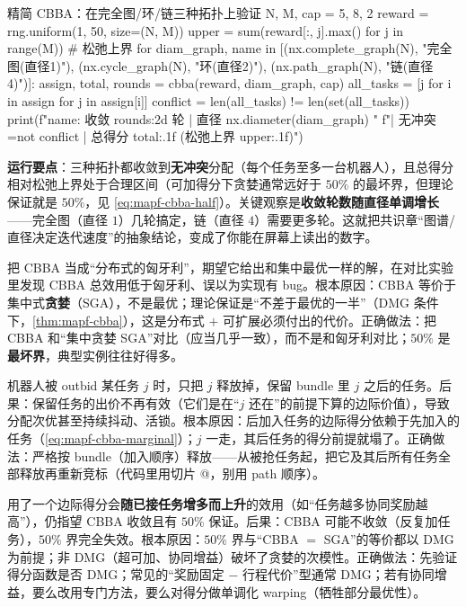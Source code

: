 \begin{codebox}[Python]{精简 CBBA：在完全图/环/链三种拓扑上验证}
N, M, cap = 5, 8, 2
reward = rng.uniform(1, 50, size=(N, M))
upper = sum(reward[:, j].max() for j in range(M))          # 松弛上界
for diam_graph, name in [(nx.complete_graph(N), "完全图(直径1)"),
                         (nx.cycle_graph(N), "环(直径2)"), (nx.path_graph(N), "链(直径4)")]:
    assign, total, rounds = cbba(reward, diam_graph, cap)
    all_tasks = [j for i in assign for j in assign[i]]
    conflict = len(all_tasks) != len(set(all_tasks))
    print(f"{name}: 收敛 {rounds:2d} 轮 | 直径 {nx.diameter(diam_graph)} "
          f"| 无冲突={not conflict} | 总得分 {total:.1f} (松弛上界 {upper:.1f})")
\end{codebox}

\textbf{运行要点}：三种拓扑都收敛到\textbf{无冲突}分配（每个任务至多一台机器人），且总得分相对松弛上界处于合理区间（可加得分下贪婪通常远好于 $50\%$ 的最坏界，但理论保证就是 $50\%$，见 \cref{eq:mapf-cbba-half}）。关键观察是\textbf{收敛轮数随直径单调增长}——完全图（直径 $1$）几轮搞定，链（直径 $4$）需要更多轮。这就把共识章“图谱/直径决定迭代速度”的抽象结论，变成了你能在屏幕上读出的数字。

\begin{pitfall}
把 CBBA 当成“分布式的匈牙利”，期望它给出和集中最优一样的解，在对比实验里发现 CBBA 总效用低于匈牙利、误以为实现有 bug。根本原因：CBBA 等价于集中式\textbf{贪婪}（SGA），不是最优；理论保证是“不差于最优的一半”（DMG 条件下，\cref{thm:mapf-cbba}），这是分布式 $+$ 可扩展必须付出的代价。正确做法：把 CBBA 和“集中贪婪 SGA”对比（应当几乎一致），而不是和匈牙利对比；$50\%$ 是\textbf{最坏界}，典型实例往往好得多。
\end{pitfall}

\begin{pitfall}
机器人被 outbid 某任务 $j$ 时，只把 $j$ 释放掉，保留 bundle 里 $j$ 之后的任务。后果：保留任务的出价不再有效（它们是在“$j$ 还在”的前提下算的边际价值），导致分配次优甚至持续抖动、活锁。根本原因：后加入任务的边际得分依赖于先加入的任务（\cref{eq:mapf-cbba-marginal}）；$j$ 一走，其后任务的得分前提就塌了。正确做法：严格按 bundle（加入顺序）释放——从被抢任务起，把它及其后所有任务全部释放再重新竞标（代码里用切片 @，别用 path 顺序）。
\end{pitfall}

\begin{pitfall}
用了一个边际得分会\textbf{随已接任务增多而上升}的效用（如“任务越多协同奖励越高”），仍指望 CBBA 收敛且有 $50\%$ 保证。后果：CBBA 可能不收敛（反复加任务），$50\%$ 界完全失效。根本原因：$50\%$ 界与“CBBA $=$ SGA”的等价都以 DMG 为前提；非 DMG（超可加、协同增益）破坏了贪婪的次模性。正确做法：先验证得分函数是否 DMG；常见的“奖励固定 $-$ 行程代价”型通常 DMG；若有协同增益，要么改用专门方法，要么对得分做单调化 warping（牺牲部分最优性）。
\end{pitfall}

